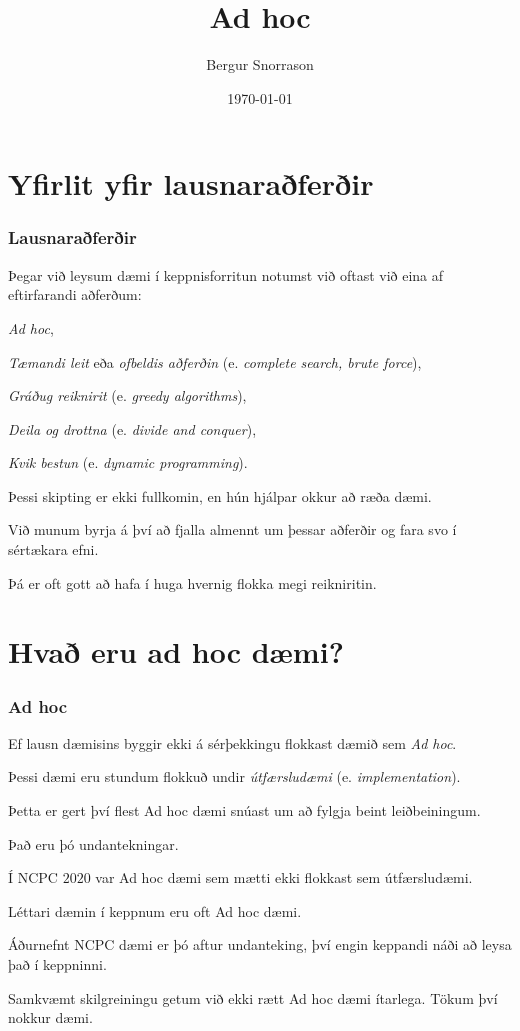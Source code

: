\title{Ad hoc}
\author{Bergur Snorrason}
\date{\today}



\frame{\titlepage}

\section{Yfirlit yfir lausnaraðferðir}
{
    \frametitle{Lausnaraðferðir}
    {
        \item<1-> Þegar við leysum dæmi í keppnisforritun notumst við oftast við eina af eftirfarandi aðferðum:
        {
            \item<2-> \emph{Ad hoc},
            \item<3-> \emph{Tæmandi leit} eða \emph{ofbeldis aðferðin} (e. \emph{complete search, brute force}),
            \item<4-> \emph{Gráðug reiknirit} (e. \emph{greedy algorithms}),
            \item<5-> \emph{Deila og drottna} (e. \emph{divide and conquer}),
            \item<6-> \emph{Kvik bestun} (e. \emph{dynamic programming}).
        }
        \item<7-> Þessi skipting er ekki fullkomin, en hún hjálpar okkur að ræða dæmi.
        \item<8-> Við munum byrja á því að fjalla almennt um þessar aðferðir og fara svo í sértækara efni.
        \item<9-> Þá er oft gott að hafa í huga hvernig flokka megi reikniritin.
    }
}

\section{Hvað eru ad hoc dæmi?}
{
    \frametitle{Ad hoc}
    {
        \item<1-> Ef lausn dæmisins byggir ekki á sérþekkingu flokkast dæmið sem \emph{Ad hoc}.
        \item<2-> Þessi dæmi eru stundum flokkuð undir \emph{útfærsludæmi} (e. \emph{implementation}).
        \item<3-> Þetta er gert því flest Ad hoc dæmi snúast um að fylgja beint leiðbeiningum.
        \item<4-> Það eru þó undantekningar.
        \item<5-> Í NCPC $2020$ var Ad hoc dæmi sem mætti ekki flokkast sem útfærsludæmi.
        \item<6-> Léttari dæmin í keppnum eru oft Ad hoc dæmi.
        \item<7-> Áðurnefnt NCPC dæmi er þó aftur undanteking, því engin keppandi náði að leysa það í keppninni.
        \item<8-> Samkvæmt skilgreiningu getum við ekki rætt Ad hoc dæmi ítarlega. Tökum því nokkur dæmi.
    }
}

